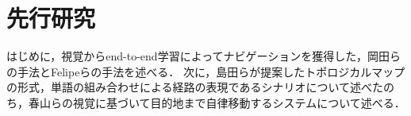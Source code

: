 \chapter{先行研究}
\label{chap:prior}
はじめに，視覚からend-to-end学習によってナビゲーションを獲得した，岡田らの手法とFelipeらの手法を述べる．
次に，島田らが提案したトポロジカルマップの形式，単語の組み合わせによる経路の表現であるシナリオについて述べたのち，春山らの視覚に基づいて目的地まで自律移動するシステムについて述べる．

\clearpage



\clearpage


